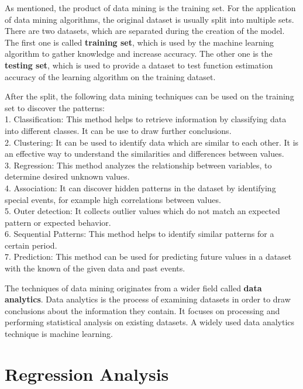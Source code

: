As mentioned, the product of data mining is the training set. For the application of data mining algorithms, the original dataset is usually split into multiple sets. There are two datasets, which are separated during the creation of the model. The first one is called \textbf{training set}, which is used by the machine learning algorithm to gather knowledge and increase accuracy. The other one is the \textbf{testing set}, which is used to provide a dataset to test function estimation accuracy of the learning algorithm on the training dataset.\medskip

After the split, the following data mining techniques \cite{pujari2001data} can be used on the training set to discover the patterns:\\
1. Classification: This method helps to retrieve information by classifying data into different classes. It can be use to draw further conclusions.\\
2. Clustering: It can be used to identify data which are similar to each other. It is an effective way to understand the similarities and differences between values.\\
3. Regression:  This method analyzes the relationship between variables, to determine desired unknown values.\\
4. Association: It can discover hidden patterns in the dataset by identifying special events, for example high correlations between values.\\
5. Outer detection: It collects outlier values which do not match an expected pattern or expected behavior. \\
6. Sequential Patterns: This method helps to identify similar patterns for a certain period. \\
7. Prediction: This method can be used for predicting future values in a dataset with the known of the given data and past events.  \medskip

The techniques of data mining originates from a wider field called \textbf{data analytics}. Data analytics is the process of examining datasets in order to draw conclusions about the information they contain. It focuses on processing and performing statistical analysis on existing datasets. A widely used data analytics technique is machine learning.



\section{Regression Analysis}

